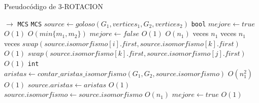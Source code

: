 \begin{algorithm}[H]
  \small
  \begin{algorithmic}[1]
  \caption{Pseudocódigo de 3-ROTACION}
  \label{algo:1-1}
    $\rightarrow$ \texttt{MCS}
      \State \texttt{MCS} $source \gets goloso(G_1, vertices_1, G_2, vertices_2)$
      \State \texttt{bool} $mejore \gets true$
      \Comment $O(1)$
      \Comment $O(min\{m_1, m_2\})$
        \State $mejore \gets false$
        \Comment $O(1)$
        \Comment $O(n_1)$ veces
          \Comment $n_1$ veces
            \Comment $n_1$ veces
              \State $swap(source.isomorfismo[i].first, source.isomorfismo[k].first)$
              \Comment $O(1)$
              \State $swap(source.isomorfismo[k].first, source.isomorfismo[j].first)$
              \Comment $O(1)$
              \State \texttt{int} $aristas \gets contar\_aristas\_isomorfismo(G_1, G_2, source.isomorfismo)$
              \Comment $O(n_1^2)$
              \Comment $O(1)$
                \State $source.aristas \gets aristas$ 
                \Comment $O(1)$             
                \State $source.isomorfismo \gets source.isomorfismo$
                \Comment $O(n_1)$
                \State $mejore \gets true$
                \Comment $O(1)$
              \EndIf
            \EndFor
          \EndFor
        \EndFor
      \EndWhile
    \EndProcedure
  \end{algorithmic}
\end{algorithm}


